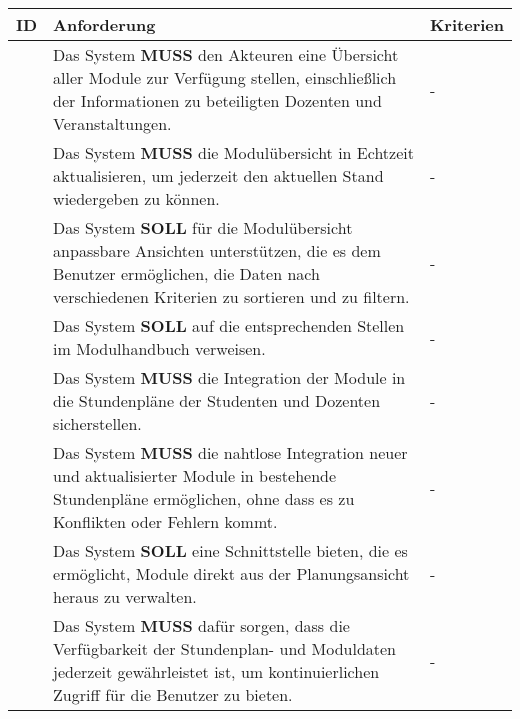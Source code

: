 \begin{tabular} {|p{}|p{}|p{}|}
	\hline
	ID & Anforderung & Kriterien \\
	\hline
	\printfreqnr
	& Das System \textbf{MUSS} den Akteuren eine Übersicht aller Module zur Verfügung stellen, einschließlich der Informationen zu beteiligten Dozenten und Veranstaltungen. 
	& - \\
	\hline
	\printfreqnr
	& Das System \textbf{MUSS} die Modulübersicht in Echtzeit aktualisieren, um jederzeit den aktuellen Stand wiedergeben zu können. 
	& - \\
	\hline
	\printfreqnr
	& Das System \textbf{SOLL} für die Modulübersicht anpassbare Ansichten unterstützen, die es dem Benutzer ermöglichen, die Daten nach verschiedenen Kriterien zu sortieren und zu filtern. 
	& - \\
	\hline
	\printfreqnr
	& Das System \textbf{SOLL} auf die entsprechenden Stellen im Modulhandbuch verweisen. 
	& - \\
	\hline
	\printfreqnr
	& Das System \textbf{MUSS} die Integration der Module in die Stundenpläne der Studenten und Dozenten sicherstellen. 
	& - \\
	\hline
	\printfreqnr
	& Das System \textbf{MUSS} die nahtlose Integration neuer und aktualisierter Module in bestehende Stundenpläne ermöglichen, ohne dass es zu Konflikten oder Fehlern kommt. 
	& - \\
	\hline
	\printfreqnr
	& Das System \textbf{SOLL} eine Schnittstelle bieten, die es ermöglicht, Module direkt aus der Planungsansicht heraus zu verwalten. 
	& - \\
	\hline
	\printfreqnr
	& Das System \textbf{MUSS} dafür sorgen, dass die Verfügbarkeit der Stundenplan- und Moduldaten jederzeit gewährleistet ist, um kontinuierlichen Zugriff für die Benutzer zu bieten. 
	& - \\
	\hline
\end{tabular}

